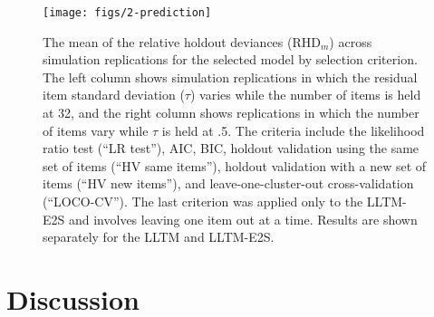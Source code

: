 \begin{figure}
	\centering
	\texttt{[image: figs/2-prediction]}
	\caption{The mean of the relative holdout deviances ($\mathrm{RHD}_m$) across simulation replications for the selected model by selection criterion. The left column shows simulation replications in which the residual item standard deviation ($\tau$) varies while the number of items is held at 32, and the right column shows replications in which the number of items vary while $\tau$ is held at .5. The criteria include the likelihood ratio test (``LR test''), AIC, BIC, holdout validation using the same set of items (``HV same items''), holdout validation with a new set of items (``HV new items''), and leave-one-cluster-out cross-validation (``LOCO-CV''). The last criterion was applied only to the LLTM-E2S and involves leaving one item out at a time. Results are shown separately for the LLTM and LLTM-E2S.
	}
	\label{fig:2-prediction}
\end{figure}


%


\section{Discussion}


